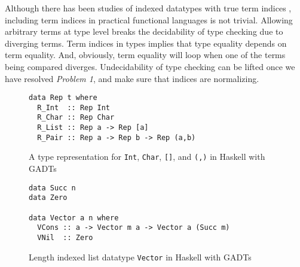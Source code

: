 Although there has been studies of indexed datatypes with true term indices
\cite{Zenger97}, including term indices in practical functional languages
is not trivial. Allowing arbitrary terms at type level breaks the decidability
of type checking due to diverging terms. Term indices in types implies that
type equality depends on term equality. And, obviously, term equality will loop
when one of the terms being compared diverges. Undecidability of type checking
can be lifted once we have resolved \textit{Problem 1}, and make sure that
indices are normalizing.

\begin{figure}
\begin{verbatim}
data Rep t where
  R_Int  :: Rep Int
  R_Char :: Rep Char
  R_List :: Rep a -> Rep [a]
  R_Pair :: Rep a -> Rep b -> Rep (a,b)
\end{verbatim}
\caption{A type representation for \texttt{Int}, \texttt{Char},
	\texttt{[]}, and \texttt{(,)} in Haskell with GADTs}
\label{fig:rep}
\end{figure}

\begin{figure}
\begin{verbatim}
data Succ n
data Zero

data Vector a n where
  VCons :: a -> Vector m a -> Vector a (Succ m)
  VNil  :: Zero
\end{verbatim}
\caption{Length indexed list datatype \texttt{Vector}
	in Haskell with GADTs}
\label{fig:vec}
\end{figure}



\paragraph{} ~\\

